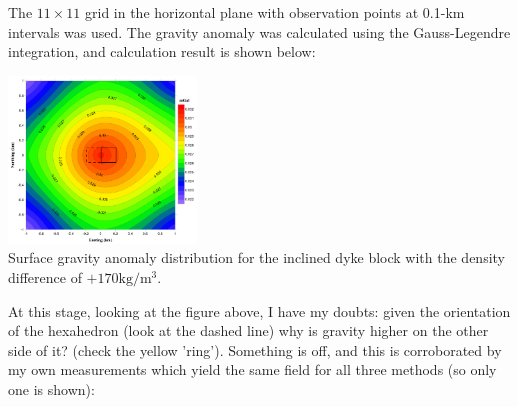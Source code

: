 The $11 \times 11$ grid in the horizontal plane with observation
points at 0.1-km intervals was used. The gravity anomaly
was calculated using the Gauss-Legendre integration, and calculation result is shown below:

\begin{center}
\includegraphics[width=5cm]{python_codes/fieldstone_113/images/uwms19_b}\\
{\captionfont Surface gravity anomaly distribution for the inclined dyke
block with the density difference of $+170 \si{\kg\per\cubic\meter}$.}
\end{center}

At this stage, looking at the figure above, I have my doubts: given the orientation of
the hexahedron (look at the dashed line) why is gravity higher on the other side of it?
(check the yellow 'ring'). Something is off, and this is corroborated by my own 
measurements which yield the same field for all three methods (so only one is shown): 

